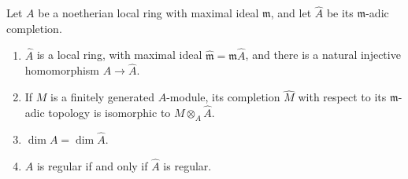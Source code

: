 Let $A$ be a noetherian local ring with maximal ideal $\mathfrak{m}$, and let $\hat{A}$ be its $\mathfrak{m}$-adic completion.

\begin{enumerate}
\item[(a)] $\hat{A}$ is a local ring, with maximal ideal $\hat{\mathfrak{m}} = \mathfrak{m}\hat{A}$, and there is a natural injective homomorphism $A \to \hat{A}$.
\item[(b)] If $M$ is a finitely generated $A$-module, its completion $\hat{M}$ with respect to its $\mathfrak{m}$-adic topology is isomorphic to $M \otimes_A \hat{A}$.
\item[(c)] $\dim A = \dim \hat{A}$.
\item[(d)] $A$ is regular if and only if $\hat{A}$ is regular.
\end{enumerate}
